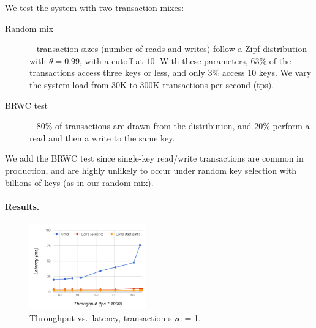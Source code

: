 We test the system with two transaction mixes:
\begin{description}
\item[Random mix] -- 
transaction sizes (number of reads and writes) follow a Zipf distribution with $\theta=0.99$, with a cutoff at $10$. 
With these parameters, $63\%$ of the transactions access three keys or less, and only $3\%$ access $10$ keys. 
We vary the system load from 30K to 300K transactions per second (tps). 
\item[BRWC test] -- $80\%$ of transactions are drawn from the  distribution, and $20\%$ perform a read
and then a write to the same key. 
\end{description}

We add the BRWC test since single-key read/write transactions are common in production, and are highly unlikely to 
occur under random key selection with billions of keys (as in our random mix).

\paragraph{Results.} 

\begin{figure}[t]
\centering
	\includegraphics[width=0.45\textwidth]{figs/thpt-latency-1.png}
	\caption{Throughput vs.\ latency, transaction size = 1.}
  \label{fig:tl-1}
\end{figure}

